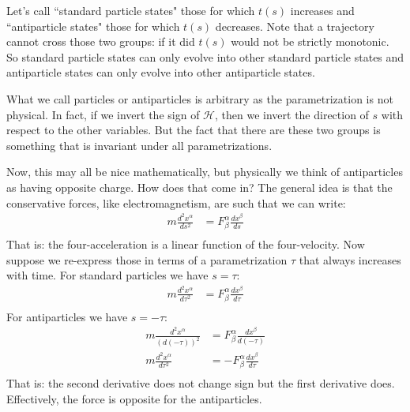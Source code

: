 \documentclass[aps,pra,10pt,floatfix,nofootinbib]{revtex4-1}
\theoremstyle{definition}
\begin{document}
Let's call ``standard particle states" those for which $t(s)$ increases and ``antiparticle states" those for which $t(s)$ decreases. Note that a trajectory cannot cross those two groups: if it did $t(s)$ would not be strictly monotonic. So standard particle states can only evolve into other standard particle states and antiparticle states can only evolve into other antiparticle states.

What we call particles or antiparticles is arbitrary as the parametrization is not physical. In fact, if we invert the sign of $\mathcal{H}$, then we invert the direction of $s$ with respect to the other variables. But the fact that there are these two groups is something that is invariant under all parametrizations.

Now, this may all be nice mathematically, but physically we think of antiparticles as having opposite charge. How does that come in? The general idea is that the conservative forces, like electromagnetism, are such that we can write:
\begin{equation}
\begin{aligned}
m\frac{d^2x^\alpha}{ds^2} &= F^\alpha_\beta \frac{dx^\beta}{ds} \\
\end{aligned}
\label{NewtonHamilton}
\end{equation}
That is: the four-acceleration is a linear function of the four-velocity. Now suppose we re-express those in terms of a parametrization $\tau$ that always increases with time. For standard particles we have $s = \tau$:
\begin{equation}
\begin{aligned}
	m\frac{d^2x^\alpha}{d\tau^2} &= F^\alpha_\beta \frac{dx^\beta}{d\tau} \\
\end{aligned}
\label{NewtonHamiltonParticles}
\end{equation}
For antiparticles we have $s = - \tau$:
\begin{equation}
\begin{aligned}
m\frac{d^2x^\alpha}{(d(-\tau))^2} &= F^\alpha_\beta \frac{dx^\beta}{d(-\tau)} \\
m\frac{d^2x^\alpha}{d\tau^2} &= - F^\alpha_\beta \frac{dx^\beta}{d\tau} \\
\end{aligned}
\label{NewtonHamiltonAntiParticles}
\end{equation}
That is: the second derivative does not change sign but the first derivative does. Effectively, the force is opposite for the antiparticles.
\end{document}
